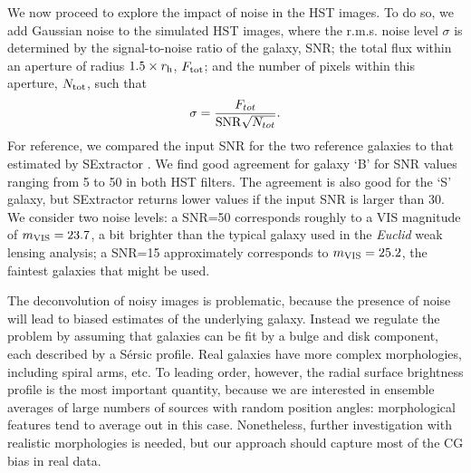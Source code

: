 \documentclass[useAMS,usenatbib]{mnras}
\newcommand{\be}{\begin{equation}}
\newcommand{\ee}{\end{equation}}
\begin{document}
We now proceed to explore the impact of noise in the HST images. To do so, we add Gaussian noise to the simulated HST images, where the r.m.s. noise level $\sigma$ is determined by the signal-to-noise ratio of the galaxy, SNR; the total flux within an aperture of radius $1.5\times r_{\rm h}$, $F_{\rm tot}$; and the number of pixels within this aperture, $N_{\rm tot}$, such that
%
\be
\sigma = {F_{tot} \over {\rm SNR} \sqrt{N_{tot}} }.
\ee
%
For reference, we compared the input SNR for the two reference galaxies
to that estimated by {\sc SExtractor} \citep{Bertin96}.
We find good agreement for galaxy `B' for SNR values ranging from 5 to 50
in both HST filters. The agreement is also good for the `S' galaxy, but 
{\textsc SExtractor} returns lower values if the input SNR is larger than 30.
We consider two noise levels: a SNR=50 corresponds roughly to a 
VIS magnitude of $m_{\rm VIS}=23.7$, a bit brighter than the typical
galaxy used in the {\it Euclid} weak lensing analysis; a SNR=15 approximately 
corresponds to $m_{\rm VIS}=25.2$, the faintest galaxies that might be used.

The deconvolution of noisy images is problematic, because the presence of noise will lead to biased estimates of the underlying galaxy. Instead we regulate the problem by assuming that galaxies can be fit by a bulge and disk component, each described by a S{\'e}rsic profile. Real galaxies have more complex morphologies, including spiral arms, etc. To leading order, however, the radial surface brightness profile is the most important quantity, because we are interested in ensemble averages of large numbers of sources with random position angles: morphological features tend to average out in this case. Nonetheless, further investigation with realistic morphologies is needed, but our approach should capture most of the CG bias in real data.
\end{document}
